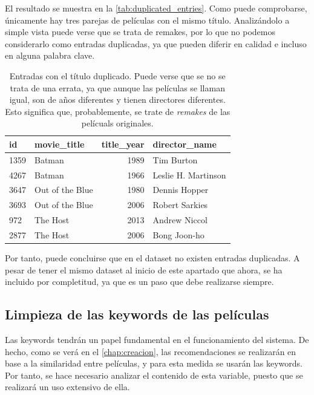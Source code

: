 El resultado se muestra en la \autoref{tab:duplicated_entries}. Como puede comprobarse, únicamente hay tres parejas de películas con el mismo título. Analizándolo a simple vista puede verse que se trata de remakes, por lo que no podemos considerarlo como entradas duplicadas, ya que pueden diferir en calidad e incluso en alguna palabra clave.
\begin{table}[h]
\centering
\begin{tabular}{llrl}
\toprule
\textbf{id} &     \textbf{movie\_title} &  \textbf{title\_year} &        \textbf{director\_name} \\
\midrule
1359 &           Batman &      1989 &           Tim Burton \\
4267 &           Batman &      1966 &  Leslie H. Martinson \\
3647 &  Out of the Blue &      1980 &        Dennis Hopper \\
3693 &  Out of the Blue &      2006 &       Robert Sarkies \\
972  &         The Host &      2013 &        Andrew Niccol \\
2877 &         The Host &      2006 &         Bong Joon-ho \\
\bottomrule
\end{tabular}
\caption{Entradas con el título duplicado. Puede verse que se no se trata de una errata, ya que aunque las películas se llaman igual, son de años diferentes y tienen directores diferentes. Esto significa que, probablemente, se trate de \textit{remakes} de las pelícuals originales.}
\label{tab:duplicated_entries}
\end{table}

Por tanto, puede concluirse que en el dataset no existen entradas duplicadas. A pesar de tener el mismo dataset al inicio de este apartado que ahora, se ha incluido por completitud, ya que es un paso que debe realizarse siempre.

\subsection{Limpieza de las keywords de las películas}

Las keywords tendrán un papel fundamental en el funcionamiento del sistema. De hecho, como se verá en el \autoref{chap:creacion}, las recomendaciones se realizarán en base a la similaridad entre películas, y para esta medida se usarán las keywords. Por tanto, se hace necesario analizar el contenido de esta variable, puesto que se realizará un uso extensivo de ella.\\

